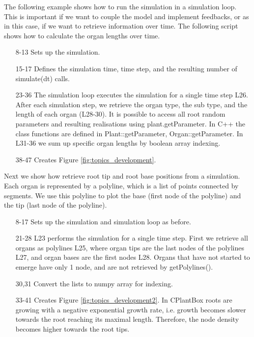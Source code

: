 The following example shows how to run the simulation in a simulation loop. This is important if we want to couple the model and implement feedbacks, or as in this case, if we want to retrieve information over time. The following script shows how to calculate the organ lengths over time. 



\begin{itemize}
\item[8-13] Sets up the simulation.

\item[15-17] Defines the simulation time, time step, and the resulting number of simulate(dt) calls. 

\item[23-36] The simulation loop executes the simulation for a single time step L26. After each simulation step, we retrieve the organ type, the sub type, and the length of each organ (L28-30). It is possible to access all root random parameters and resulting realisations using plant.getParameter. In C++ the class functions are defined in Plant::getParameter, Organ::getParameter. In L31-36 we sum up specific organ lengths by boolean array indexing.

\item[38-47] Creates Figure \ref{fig:topics_development}.

\end{itemize}


Next we show how retrieve root tip and root base positions from a simulation. Each organ is represented by a polyline, which is a list of points connected by segments. We use this polyline to plot the base (first node of the polyline) and the tip (last node of the polyline). 



\begin{itemize}

\item[8-17] Sets up the simulation and simulation loop as before.

\item[21-28] L23 performs the simulation for a single time step. First we retrieve all organs as polylines L25, where organ tips are the last nodes of the polylines L27, and organ bases are the first nodes L28. Organs that have not started to emerge have only 1 node, and are not retrieved by getPolylines().

\item[30,31] Convert the lists to numpy array for indexing.

\item[33-41] Creates Figure \ref{fig:topics_development2}. In CPlantBox roots are growing with a negative exponential growth rate, i.e. growth becomes slower towards the root reaching its maximal length. Therefore, the node density becomes higher towards the root tips. 

\end{itemize}

